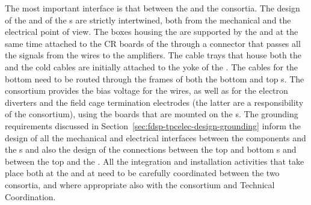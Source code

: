 The most important interface is that between the 
and the  consortia. The design of the 
and of the s are strictly intertwined, both from the
mechanical and the electrical point of view. The 
boxes housing the  are supported by the 
and at the same time attached to the CR boards of the 
through a connector that passes all the signals from the wires to
the  amplifiers. The cable trays that house both the
 and the  cold cables are initially
attached to the yoke of the . The 
cables for the bottom  need to be routed through the 
frames of both the bottom and top s. The 
consortium provides the bias voltage for the 
wires, as well as for the electron diverters and the field
cage termination electrodes (the latter are a responsibility of
the  consortium), using the  boards that are mounted
on the s. The grounding requirements discussed in
Section~\ref{sec:fdsp-tpcelec-design-grounding} inform the
design of all the mechanical and electrical interfaces between
the  components and the s and also the
design of the connections between the top and bottom s
and between the top  and the . All the
integration and installation activities that take place both at
the  and at \surf need to be carefully coordinated between
the two consortia, and where appropriate also with the 
consortium and Technical Coordination.

\subsection{}
\label{sec:fdsp-tpcelec-interfaces-daq}

